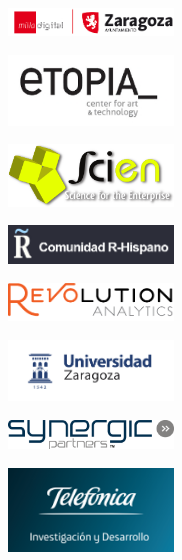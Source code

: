 

\begin{center}

\includegraphics[width=0.33\textwidth]{Logos/logoMillaAyZgz.png}
\hspace{1cm}

\includegraphics[width=0.33\textwidth]{Logos/logoEtopia.jpg}
\hspace{1cm}

\includegraphics[width=0.33\textwidth]{Logos/logoScien.png}
\hspace{1cm}

\includegraphics[width=0.33\textwidth]{Logos/logoComRHisp.png}
\vspace{1cm}

\includegraphics[width=0.33\textwidth]{Logos/logoRevolAnal}
\hspace{1cm}

\includegraphics[width=0.33\textwidth]{Logos/logoUZ.png}
\hspace{1cm}

\includegraphics[width=0.33\textwidth]{Logos/logoSynergic.png}
\vspace{1cm}

\includegraphics[width=0.33\textwidth]{Logos/logoTelefID.png}

\end{center}
